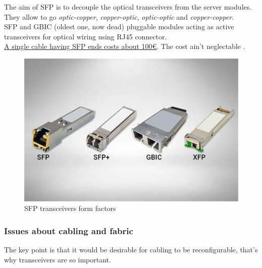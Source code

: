 \begin{paracol}{2}
   
   The aim of SFP is to decouple the optical transceivers from the server modules.
   They allow to go \textit{optic-copper}, \textit{copper-optic}, \textit{optic-optic} and \textit{copper-copper}.\\
   SFP and GBIC (oldest one, now dead) pluggable modules acting as active transceivers for optical wiring using RJ45 connector.\\
   \ul{A single cable having SFP ends costs about 100€}.
   The cost ain't neglectable \smiley.


   \switchcolumn

   \begin{figure}[htbp]
      \centering
      \includegraphics{images/sfp.jpeg}
      \caption{SFP transceivers form factors}
      \label{fig:sfp}
   \end{figure}
\end{paracol}


\subsubsection{Issues about cabling and fabric}
The key point is that it would be desirable for cabling to be reconfigurable, that's why transceivers are so important.

